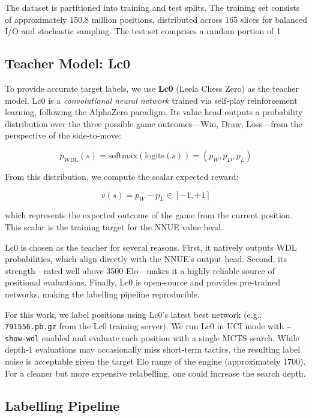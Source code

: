 The dataset is partitioned into training and test splits. The training set consists of approximately 150.8 million positions, distributed across 165 slices for balanced I/O and stochastic sampling. The test set comprises a random portion of 1\\%

\subsection{Teacher Model: Lc0}

To provide accurate target labels, we use \textbf{Lc0} (Leela Chess Zero) as the teacher model. Lc0 is a \emph{convolutional neural network} trained via self‑play reinforcement learning, following the AlphaZero paradigm. Its value head outputs a probability distribution over the three possible game outcomes---Win, Draw, Loss---from the perspective of the side‑to‑move:

\[p_{\text{WDL}}(s) = \text{softmax}(\text{logits}(s)) = (p_W, p_D, p_L)\]

From this distribution, we compute the scalar expected reward:

\[v(s) = p_W - p_L \in [-1, +1]\]

which represents the expected outcome of the game from the current position. This scalar is the training target for the NNUE value head.

Lc0 is chosen as the teacher for several reasons. First, it natively outputs WDL probabilities, which align directly with the NNUE's output head. Second, its strength---rated well above 3500 Elo---makes it a highly reliable source of positional evaluations.  Finally, Lc0 is open‑source and provides pre‑trained networks, making the labelling pipeline reproducible.

For this work, we label positions using Lc0's latest best network (e.g., \texttt{791556.pb.gz} from the Lc0 training server). We run Lc0 in UCI mode with \texttt{--show-wdl} enabled and evaluate each position with a single MCTS search. While depth‑1 evaluations may occasionally miss short‑term tactics, the resulting label noise is acceptable given the target Elo range of the engine (approximately 1700). For a cleaner but more expensive relabelling, one could increase the search depth.

\subsection{Labelling Pipeline}

